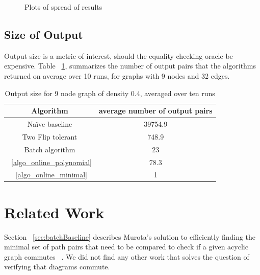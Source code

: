 \documentclass[sigplan,review,anonymous]{acmart}
\begin{document}
{\begin{figure}

    \caption{Plots of spread of results}
    \label{fig:variance}
\end{figure}

\subsection{Size of Output}
Output size is a metric of interest, should the equality checking oracle be expensive.
Table ~\ref{tab:sizes}, summarizes the number of output pairs that the algorithms returned on average over 10 runs, for graphs with 9 nodes and 32 edges.

\begin{table}
\begin{tabular}{|c|c|}
    \hline
    Algorithm & average number of output pairs \\
    \hline
    Na\"{i}ve baseline & 39754.9 \\
    Two Flip tolerant & 748.9 \\
    Batch algorithm & 23 \\
    ~\ref{algo_online_polynomial} & 78.3 \\
    ~\ref{algo_online_minimal} & 1 \\
    \hline
\end{tabular}
\caption{Output size for 9 node graph of density 0.4, averaged over ten runs}
\label{tab:sizes}
\end{table}

\section{Related Work}

Section ~\ref{sec:batchBaseline} describes Murota's solution to efficiently finding the minimal set of path pairs that need to be compared to check if a given acyclic graph commutes ~\cite{commutative}.
We did not find any other work that solves the question of verifying that diagrams commute.

}
\end{document}
